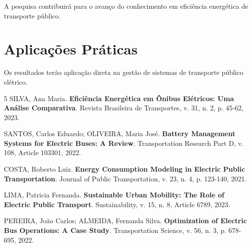 \documentclass[qualificacao-mestrado,onehalfspacing,12pt,hyperref]{UnB-PPGT}
\begin{document}
A pesquisa contribuirá para o avanço do conhecimento em eficiência energética de transporte público.

\section{Aplicações Práticas}
\label{sec:aplicacoes}

Os resultados terão aplicação direta na gestão de sistemas de transporte público elétrico.

\postextual

\begin{thebibliography}{5}
 SILVA, Ana Maria. \textbf{Eficiência Energética em Ônibus Elétricos: Uma Análise Comparativa}. Revista Brasileira de Transportes, v. 31, n. 2, p. 45-62, 2023.

 SANTOS, Carlos Eduardo; OLIVEIRA, Maria José. \textbf{Battery Management Systems for Electric Buses: A Review}. Transportation Research Part D, v. 108, Article 103301, 2022.

 COSTA, Roberto Luiz. \textbf{Energy Consumption Modeling in Electric Public Transportation}. Journal of Public Transportation, v. 23, n. 4, p. 123-140, 2021.

 LIMA, Patricia Fernanda. \textbf{Sustainable Urban Mobility: The Role of Electric Public Transport}. Sustainability, v. 15, n. 8, Article 6789, 2023.

 PEREIRA, João Carlos; ALMEIDA, Fernanda Silva. \textbf{Optimization of Electric Bus Operations: A Case Study}. Transportation Science, v. 56, n. 3, p. 678-695, 2022.
\end{thebibliography}
\end{document}
